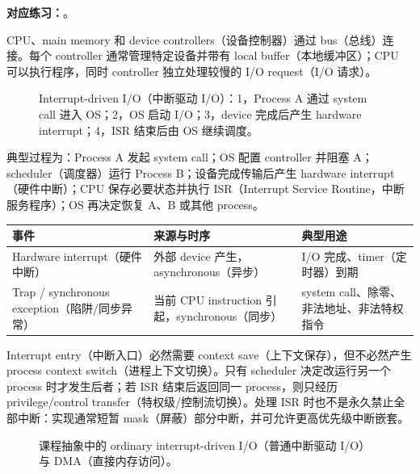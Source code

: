 \textbf{对应练习：}。


CPU、main memory 和 device controllers（设备控制器）通过 bus（总线）连接。每个 controller 通常管理特定设备并带有 local buffer（本地缓冲区）；CPU 可以执行程序，同时 controller 独立处理较慢的 I/O request（I/O 请求）。

\begin{figure}[htbp]
  \centering
  \resizebox{\textwidth}{!}{}
  \caption{Interrupt-driven I/O（中断驱动 I/O）：1，Process A 通过 system call 进入 OS；2，OS 启动 I/O；3，device 完成后产生 hardware interrupt；4，ISR 结束后由 OS 继续调度。}
  \label{fig:sc2005-l02-interrupt-timeline}
\end{figure}

典型过程为：Process A 发起 system call；OS 配置 controller 并阻塞 A；scheduler（调度器）运行 Process B；设备完成传输后产生 hardware interrupt（硬件中断）；CPU 保存必要状态并执行 ISR（Interrupt Service Routine，中断服务程序）；OS 再决定恢复 A、B 或其他 process。

\begin{center}
\small
\begin{tabularx}{0.94\textwidth}{@{}>{\raggedright\arraybackslash}p{3.3cm}>{\raggedright\arraybackslash}p{3.1cm}X@{}}
  \toprule
  事件 & 来源与时序 & 典型用途 \\
  \midrule
  Hardware interrupt（硬件中断） & 外部 device 产生，asynchronous（异步） & I/O 完成、timer（定时器）到期 \\
  Trap / synchronous exception（陷阱/同步异常） & 当前 CPU instruction 引起，synchronous（同步） & system call、除零、非法地址、非法特权指令 \\
  \bottomrule
\end{tabularx}
\end{center}

Interrupt entry（中断入口）必然需要 context save（上下文保存），但不必然产生 process context switch（进程上下文切换）。只有 scheduler 决定改运行另一个 process 时才发生后者；若 ISR 结束后返回同一 process，则只经历 privilege/control transfer（特权级/控制流切换）。处理 ISR 时也不是永久禁止全部中断：实现通常短暂 mask（屏蔽）部分中断，并可允许更高优先级中断嵌套。

\begin{figure}[htbp]
  \centering
  \resizebox{0.94\textwidth}{!}{}
  \caption{课程抽象中的 ordinary interrupt-driven I/O（普通中断驱动 I/O）与 DMA（直接内存访问）。}
  \label{fig:sc2005-l02-dma-paths}
\end{figure}

